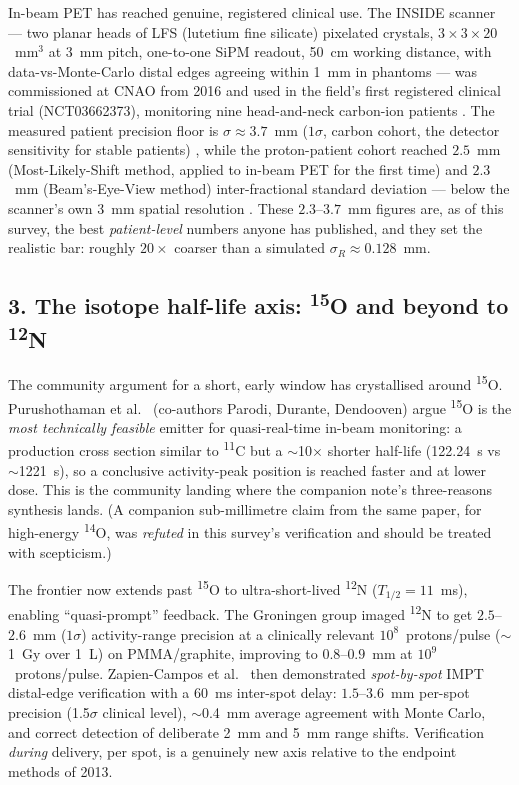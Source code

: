 \documentclass[11pt]{article}
\newcommand{\iso}[2]{\textsuperscript{#1}#2}
\begin{document}
In-beam PET has reached genuine, registered clinical use. The INSIDE scanner ---
two planar heads of LFS (lutetium fine silicate) pixelated crystals,
$3\times3\times20$~mm$^3$ at 3~mm pitch, one-to-one SiPM readout, 50~cm working
distance, with data-vs-Monte-Carlo distal edges agreeing within 1~mm in phantoms
\cite{bisogni2016} --- was commissioned at CNAO from 2016 and used in the field's
first registered clinical trial (NCT03662373), monitoring nine head-and-neck
carbon-ion patients \cite{ferrero2024}. The measured patient precision floor is
$\sigma \approx 3.7$~mm ($1\sigma$, carbon cohort, the detector sensitivity for
stable patients) \cite{ferrero2024}, while the proton-patient cohort reached
$2.5$~mm (Most-Likely-Shift method, applied to in-beam PET for the first time)
and $2.3$~mm (Beam's-Eye-View method) inter-fractional standard deviation ---
below the scanner's own 3~mm spatial resolution \cite{moglioni2022}. These
$2.3$--$3.7$~mm figures are, as of this survey, the best \emph{patient-level}
numbers anyone has published, and they set the realistic bar: roughly $20\times$
coarser than a simulated $\sigma_R \approx 0.128$~mm.

\subsection*{3. The isotope half-life axis: \iso{15}{O} and beyond to \iso{12}{N}}

The community argument for a short, early window has crystallised around
\iso{15}{O}. Purushothaman et al.~\cite{purushothaman2023} (co-authors Parodi,
Durante, Dendooven) argue \iso{15}{O} is the \emph{most technically feasible}
emitter for quasi-real-time in-beam monitoring: a production cross section similar
to \iso{11}{C} but a $\sim$10$\times$ shorter half-life (122.24~s vs $\sim$1221~s),
so a conclusive activity-peak position is reached faster and at lower dose. This
is the community landing where the companion note's three-reasons synthesis lands.
(A companion sub-millimetre claim from the same paper, for high-energy \iso{14}{O},
was \emph{refuted} in this survey's verification and should be treated with
scepticism.)

The frontier now extends past \iso{15}{O} to ultra-short-lived \iso{12}{N}
($T_{1/2}=11$~ms), enabling ``quasi-prompt'' feedback. The Groningen group
\cite{ozoemelam2020} imaged \iso{12}{N} to get $2.5$--$2.6$~mm ($1\sigma$)
activity-range precision at a clinically relevant $10^{8}$~protons/pulse
($\sim$1~Gy over 1~L) on PMMA/graphite, improving to $0.8$--$0.9$~mm at
$10^{9}$~protons/pulse. Zapien-Campos et al.~\cite{zapiencampos2025} then
demonstrated \emph{spot-by-spot} IMPT distal-edge verification with a 60~ms
inter-spot delay: $1.5$--$3.6$~mm per-spot precision (1.5$\sigma$ clinical level),
$\sim$0.4~mm average agreement with Monte Carlo, and correct detection of
deliberate 2~mm and 5~mm range shifts. Verification \emph{during} delivery, per
spot, is a genuinely new axis relative to the endpoint methods of 2013.
\end{document}
